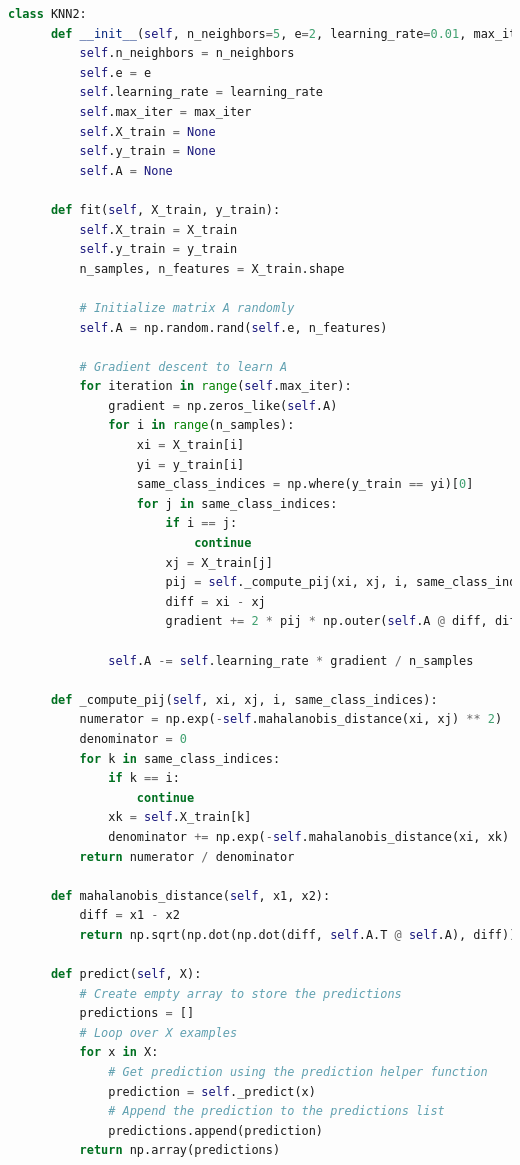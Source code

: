 \documentclass[12pt]{article}
\begin{document}
\begin{lstlisting}[language=Python]
  class KNN2:
      def __init__(self, n_neighbors=5, e=2, learning_rate=0.01, max_iter=100):
          self.n_neighbors = n_neighbors
          self.e = e
          self.learning_rate = learning_rate
          self.max_iter = max_iter
          self.X_train = None
          self.y_train = None
          self.A = None
          
      def fit(self, X_train, y_train):
          self.X_train = X_train
          self.y_train = y_train
          n_samples, n_features = X_train.shape
          
          # Initialize matrix A randomly
          self.A = np.random.rand(self.e, n_features)
          
          # Gradient descent to learn A
          for iteration in range(self.max_iter):
              gradient = np.zeros_like(self.A)
              for i in range(n_samples):
                  xi = X_train[i]
                  yi = y_train[i]
                  same_class_indices = np.where(y_train == yi)[0]
                  for j in same_class_indices:
                      if i == j:
                          continue
                      xj = X_train[j]
                      pij = self._compute_pij(xi, xj, i, same_class_indices)
                      diff = xi - xj
                      gradient += 2 * pij * np.outer(self.A @ diff, diff)
              
              self.A -= self.learning_rate * gradient / n_samples
      
      def _compute_pij(self, xi, xj, i, same_class_indices):
          numerator = np.exp(-self.mahalanobis_distance(xi, xj) ** 2)
          denominator = 0
          for k in same_class_indices:
              if k == i:
                  continue
              xk = self.X_train[k]
              denominator += np.exp(-self.mahalanobis_distance(xi, xk) ** 2)
          return numerator / denominator
  
      def mahalanobis_distance(self, x1, x2):
          diff = x1 - x2
          return np.sqrt(np.dot(np.dot(diff, self.A.T @ self.A), diff))
  
      def predict(self, X):
          # Create empty array to store the predictions
          predictions = []
          # Loop over X examples
          for x in X:
              # Get prediction using the prediction helper function
              prediction = self._predict(x)
              # Append the prediction to the predictions list
              predictions.append(prediction)
          return np.array(predictions)
      

\end{lstlisting}
\end{document}
